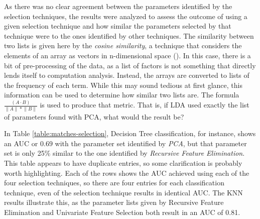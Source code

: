 \documentclass[letterpaper, notitlepage]{report}
\begin{document}
As there was no clear agreement between the parameters identified by the selection techniques, the results were analyzed to assess the outcome of using a given selection technique and how similar the parameters selected by that technique were to the ones identified by other techniques.  The similarity between two lists is given here by the \textit{cosine similarity}, a technique that considers the elements of an array as vectors in n-dimensional space (\cite{Schutze2008-zk}). In this case, there is a bit of pre-processing of the data, as a list of factors is not something that directly lends itself to computation analysis. Instead, the arrays are converted to lists of the frequency of each term. While this may sound tedious at first glance, this information can be used to determine how similar two lists are. The formula $\frac {(A \cdot B)} { \lVert A \rVert * \lVert B \rVert }$ is used to produce that metric. That is, if \gls{LDA} used exactly the list of parameters found with \gls{PCA}, what would the result be?

In Table \ref{table:matches-selection}, Decision Tree classification, for instance, shows an AUC or $0.69$ with the parameter set identified by \textit{\gls{PCA}}, but that parameter set is only 25\% similar to the one identified by \textit{Recursive Feature Elimination}.  This table appears to have duplicate entries, so some clarification is probably worth highlighting. Each of the rows shows the AUC achieved using each of the four selection techniques, so there are four entries for each classification technique, even of the selection technique results in identical AUC. The KNN results illustrate this, as the parameter lists given by Recursive Feature Elimination and Univariate Feature Selection both result in an AUC of 0.81.
\end{document}
